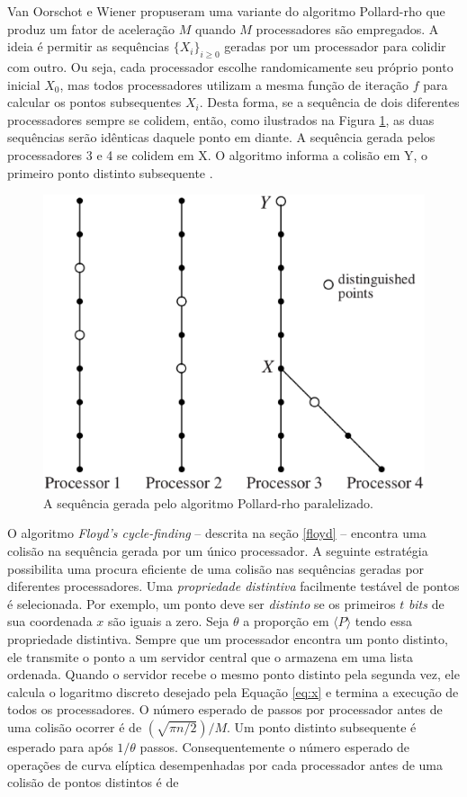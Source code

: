 Van Oorschot e Wiener propuseram uma variante do algoritmo Pollard-rho que produz um fator de aceleração \(M\) quando \(M\) processadores são empregados. A ideia é permitir as sequências $\{X_i\}_{i \geq 0}$ geradas por um processador para colidir com outro. Ou seja, cada processador escolhe randomicamente seu próprio ponto inicial \(X_0\), mas todos processadores utilizam a mesma função de iteração \(f\) para calcular os pontos subsequentes \(X_i\). Desta forma, se a sequência de dois diferentes processadores sempre se colidem, então, como ilustrados na Figura \ref{fig:paralellized}, as duas sequências serão idênticas daquele ponto em diante. A sequência gerada pelos processadores 3 e 4 se colidem em X. O algoritmo informa a colisão em Y, o primeiro ponto distinto subsequente \cite{Van:1996}.

\begin{figure}[h]
\centering
\includegraphics[scale=0.4, bb=0 0 737 604]{figuras/paralellized.eps}
\caption{A sequência gerada pelo algoritmo Pollard-rho paralelizado. }
\label{fig:paralellized}
\end{figure}

O algoritmo \textit{Floyd's cycle-finding} \--- descrita na seção \ref{floyd} \--- encontra uma colisão na sequência gerada por um único processador. A seguinte estratégia possibilita uma procura eficiente de uma colisão nas sequências geradas por diferentes processadores. Uma \textit{propriedade distintiva} facilmente testável de pontos é selecionada. Por exemplo, um ponto deve ser \textit{distinto} se os primeiros \(t\) \textit{bits} de sua coordenada \(x\) são iguais a zero. Seja \(\theta\) a proporção em $\langle P \rangle$ tendo essa propriedade distintiva. Sempre que um processador encontra um ponto distinto, ele transmite o ponto a um servidor central que o armazena em uma lista ordenada. Quando o servidor recebe o mesmo ponto distinto pela segunda vez, ele calcula o logaritmo discreto desejado pela Equação \ref{eq:x} e termina a execução de todos os processadores. O número esperado de passos por processador antes de uma colisão ocorrer é de $(\sqrt{\pi n/2})/M$. Um ponto distinto subsequente é esperado para após $1/\theta$ passos. Consequentemente o número esperado de operações de curva elíptica desempenhadas por cada processador antes de uma colisão de pontos distintos é de

